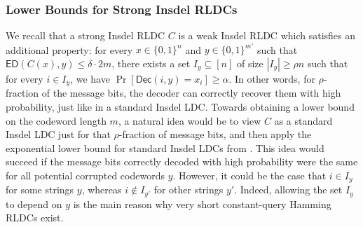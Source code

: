 \documentclass[10pt,a4paper]{article}
\theoremstyle{remark}
\newcommand{\zo}{\ensuremath{{\{0,1\}}}\xspace}
\newcommand{\Dec}{\ensuremath{\mathsf{Dec}}\xspace}
\newcommand{\ED}{\ensuremath{\mathsf{ED}}\xspace}%
\begin{document}
\subsubsection{Lower Bounds for Strong Insdel RLDCs}
We recall that a strong Insdel RLDC $C$ is a weak Insdel RLDC which satisfies an additional property: for every $x \in \zo^n$ and $y \in \zo^{m'}$ such that $\ED(C(x), y) \le \delta\cdot 2m$, 
there exists a set $I_y \subseteq [n]$ of size $|I_y|\ge \rho n$ such that for every $i \in I_y$, we have $\Pr[\Dec(i,y) = x_i] \ge \alpha$. In other words, for $\rho$-fraction of the message bits, the decoder can correctly recover them with high probability, just like in a standard Insdel LDC. 
Towards obtaining a lower bound on the codeword length $m$, a natural idea would be to view $C$ as a standard Insdel LDC just for that $\rho$-fraction of message bits, and then apply the exponential lower bound for standard Insdel LDCs from \cite{blocki2021exponential}. 
This idea would succeed if the message bits correctly decoded with high probability were the same for all potential corrupted codewords $y$. 
However, it could be the case that $i \in I_y$ for some strings $y$, whereas $i \notin I_{y'}$ for other strings $y'$. Indeed, allowing the set $I_y$ to depend on $y$ is the main reason why very short constant-query Hamming RLDCs exist.  
\end{document}
